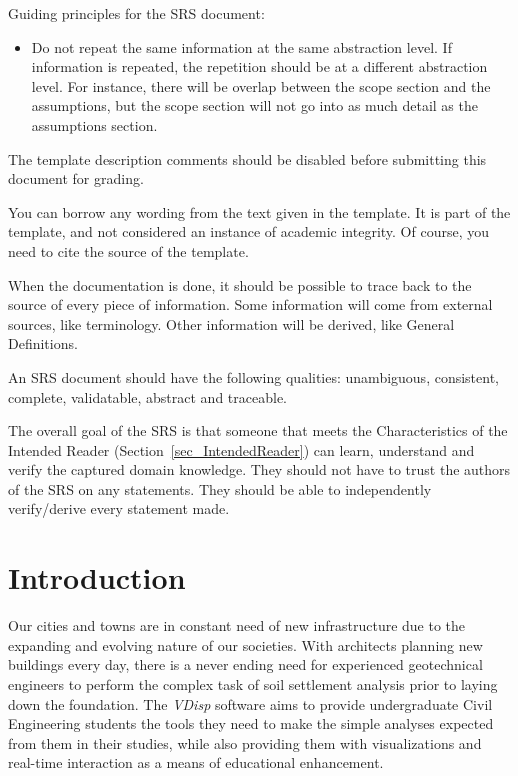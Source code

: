 \documentclass[12pt]{article}
\newcommand{\indentpar}{\phantom{=}}
\begin{document}
Guiding principles for the SRS document:
\begin{itemize}
\item Do not repeat the same information at the same abstraction level.  If
  information is repeated, the repetition should be at a different abstraction
  level.  For instance, there will be overlap between the scope section and the
  assumptions, but the scope section will not go into as much detail as the
  assumptions section.
\end{itemize}


The template description comments should be disabled before submitting this
document for grading.

You can borrow any wording from the text given in the template.  It is part of
the template, and not considered an instance of academic integrity.  Of course,
you need to cite the source of the template.

When the documentation is done, it should be possible to trace back to the
source of every piece of information.  Some information will come from external
sources, like terminology.  Other information will be derived, like General
Definitions.

An SRS document should have the following qualities: unambiguous, consistent,
complete, validatable, abstract and traceable.

The overall goal of the SRS is that someone that meets the Characteristics of
the Intended Reader (Section~\ref{sec_IntendedReader}) can learn, understand and
verify the captured domain knowledge.  They should not have to trust the authors
of the SRS on any statements.  They should be able to independently
verify/derive every statement made.

\section{Introduction}

\indentpar \indentpar Our cities and towns are in constant need of new
infrastructure due to the expanding and evolving nature of our societies. With
architects planning new buildings every day, there is a never ending need for
experienced geotechnical engineers to perform the complex task of soil
settlement analysis prior to laying down the foundation. The \emph{VDisp}
software aims to provide undergraduate Civil Engineering students the tools they
need to make the simple analyses expected from them in their studies, while also
providing them with visualizations and real-time interaction as a means of
educational enhancement.
\end{document}

